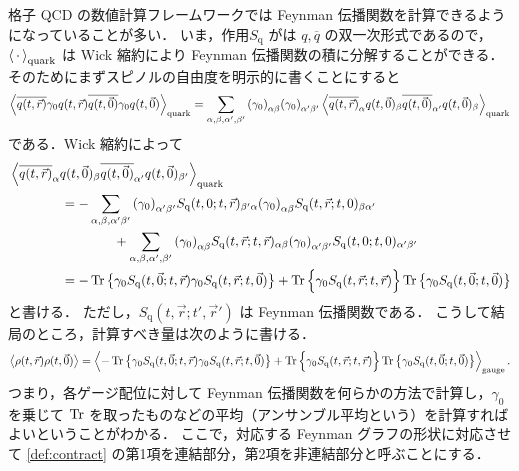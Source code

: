 \documentclass[dvipdfmx, a4paper]{jarticle}
\numberwithin{equation}{section}
\begin{document}
格子 QCD の数値計算フレームワークでは Feynman 伝播関数を計算できるようになっていることが多い．
いま，作用$S_\mathrm{q}$ がは $q, \overline{q}$ の双一次形式であるので，$\ev{\,\cdot\,}_\mathrm{quark}$ は Wick 縮約により Feynman 伝播関数の積に分解することができる．
そのためにまずスピノルの自由度を明示的に書くことにすると
\begin{align}
  \ev{\overline{q(t, \vec{r})} \gamma_0 q(t, \vec{r}) \overline{q(t, \vec{0})} \gamma_0 q(t, \vec{0})}_\mathrm{quark} = \sum_{\alpha, \beta, \alpha', \beta'} \qty(\gamma_0)_{\alpha\beta} \qty(\gamma_0)_{\alpha'\beta'} \ev{\overline{q(t, \vec{r})}_\alpha q(t, \vec{0})_\beta\overline{q(t, \vec{0})}_{\alpha'}q(t, \vec{0})_\beta}_\mathrm{quark}
\end{align}
である．Wick 縮約によって
\begin{align}
  &\ev{\overline{q(t, \vec{r})}_{\alpha}q(t, \vec{0})_\beta\overline{q(t, \vec{0})}_{\alpha'}q(t, \vec{0})_{\beta'}}_\mathrm{quark}\notag\\
  &\quad\quad\quad\quad= -\sum_{\alpha,\beta, \alpha' \beta'}\qty(\gamma_0)_{\alpha'\beta'}S_\mathrm{q}(t, 0; t, \vec{r})_{\beta'\alpha}\qty(\gamma_0)_{\alpha\beta}S_\mathrm{q}(t, \vec{r}; t, 0)_{\beta\alpha'} \notag\\
  &\quad\quad\quad\quad\quad\quad\quad\quad+ \sum_{\alpha,\beta,\alpha',\beta'}\qty(\gamma_0)_{\alpha\beta}S_\mathrm{q}(t, \vec{r}; t, \vec{r})_{\alpha\beta}\qty(\gamma_0)_{\alpha'\beta'}S_\mathrm{q}(t, 0; t, 0)_{\alpha'\beta'} \notag\\
  &\quad\quad\quad\quad= -\Tr \qty{\gamma_0 S_\mathrm{q}(t, \vec{0}; t, \vec{r})\gamma_0 S_\mathrm{q}(t, \vec{r}; t, \vec{0})} + \Tr \Big\{\gamma_0 S_\mathrm{q}(t, \vec{r}; t, \vec{r})\Big\} \Tr \qty{\gamma_0 S_\mathrm{q}(t, \vec{0}; t, \vec{0})}
\end{align}
と書ける．
ただし，$S_\mathrm{q}(t, \vec{r}; t', \vec{r}')$ は Feynman 伝播関数である．
こうして結局のところ，計算すべき量は次のように書ける．
\begin{align}
  \ev{\rho(t, \vec{r})\rho(t, \vec{0})} = \ev{-\Tr \qty{\gamma_0 S_\mathrm{q}(t, \vec{0}; t, \vec{r})\gamma_0 S_\mathrm{q}(t, \vec{r}; t, \vec{0})} + \Tr \Big\{\gamma_0 S_\mathrm{q}(t, \vec{r}; t, \vec{r})\Big\} \Tr \qty{\gamma_0 S_\mathrm{q}(t, \vec{0}; t, \vec{0})}}_\mathrm{gauge}. \label{def:contract}
\end{align}
つまり，各ゲージ配位に対して Feynman 伝播関数を何らかの方法で計算し，$\gamma_0$ を乗じて $\Tr$ を取ったものなどの平均（アンサンブル平均という）を計算すればよいということがわかる．
ここで，対応する Feynman グラフの形状に対応させて \eqref{def:contract} の第1項を連結部分，第2項を非連結部分と呼ぶことにする．
\end{document}
